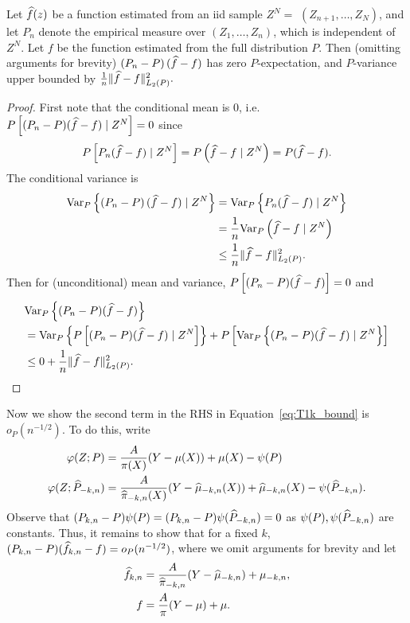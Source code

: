\begin{lemma}
\label{lem:cross_fitting}
Let $\widehat{f}(z)$ be a function estimated from an iid sample $Z^N=$ $\left(Z_{n+1}, \ldots, Z_N\right)$, and let ${P}_n$ denote the empirical measure over $\left(Z_1, \ldots, Z_n\right)$, which is independent of $Z^N$. Let $f$ be the function estimated from the full distribution $P$. Then (omitting arguments for brevity)
$
\left({P}_n-{P}\right)(\widehat{f}-f)$
has zero $P$-expectation, and $P$-variance upper bounded by
$\frac{1}{n}\|\widehat{f}-f\|_{L_2(P)}^2.$
\end{lemma}
\begin{proof}
First note that the conditional mean is 0, i.e. $P\left[(P_n-P)(\widehat{f}-f )\mid Z^N\right]=0$ since
$$
P\left[{P}_n(\widehat{f}-f) \mid Z^N\right]=P\left(\widehat{f}-f \mid Z^N\right)={P}(\widehat{f}-f) .
$$
The conditional variance is
\begin{align*}
    {\rm Var}_P\left\{\left({P}_n-{P}\right)(\widehat{f}-f) \mid Z^N\right\} &={\rm Var}_P\left\{{P}_n(\widehat{f}-f) \mid Z^N\right\}\\
    &=\frac{1}{n} {\rm Var}_P\left(\widehat{f}-f \mid Z^N\right) \\
    &\leq \frac{1}{n}\|\widehat{f}-f\|_{L_2(P)}^2.
\end{align*}
Then for (unconditional) mean and variance, $P\left[(P_n-P)(\widehat{f}-f)\right]=0$ and
\begin{align*}
&{\rm Var}_P\left\{(P_n-P)(\widehat{f}-f)\right\} \\
&= 
{\rm Var}_P \left\{P\left[(P_n-P)(\widehat{f}-f)\mid Z^N\right]  \right\}  
+P\left[{\rm Var}_P\left\{(P_n-P)(\widehat{f}-f)\mid Z^N\right\}\right]
\\
&\leq 0+\frac{1}{n}\|\widehat{f}-f\|_{L_2(P)}^2.
\end{align*}
\end{proof}
Now we show the second term in the RHS in Equation~\eqref{eq:T1k_bound} is $o_P(n^{-1/2})$. To do this, write
\begin{align}
\varphi(Z;P)&=\frac{A}{\pi(X)}(Y-\mu(X))+\mu(X)-\psi(P)\\
\varphi(Z;\widehat{P}_{-k,n})&=\frac{A}{\widehat{\pi}_{-k,n}(X)}(Y-\widehat{\mu}_{-k,n}(X))+\widehat{\mu}_{-k,n}(X)-\psi(\widehat{P}_{-k,n})    
.\end{align}
Observe that $(P_{k,n}-P)\psi(P)=(P_{k,n}-P)\psi(\widehat{P}_{-k,n})=0$ as $\psi(P),\psi(\widehat{P}_{-k,n})$ are constants.
Thus, 
it remains to show that for a fixed $k$,
$(P_{k,n}-P)( \widehat{f}_{k,n} - f)=o_P(n^{-1/2})$, 
where we omit arguments for brevity and let 
\begin{align}
\label{eq:def_f_in_emp_proc}
    \widehat{f}_{k,n} &= \frac{A}{\widehat{\pi}_{-k,n}}(Y-\widehat{\mu}_{-k,n})+\mu_{-k,n}, \\
    f &= \frac{A}{\pi}(Y-\mu) +\mu.
\end{align}

